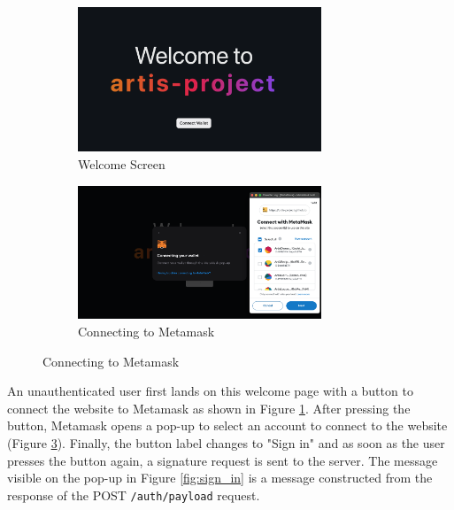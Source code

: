 \begin{figure}[h]
    \centering
    \begin{subfigure}{\textwidth}
        \centering
        \includegraphics[width=0.8\textwidth]{resources/frontend_screenshots/welcome_screen.png}
        \caption{Welcome Screen}
        \label{fig:welcome_screen}
        \vspace*{2mm}
    \end{subfigure}
    \begin{subfigure}{\textwidth}
        \centering
        \includegraphics[width=0.8\textwidth]{resources/frontend_screenshots/connecting_wallet.png}
        \caption{Connecting to Metamask}
        \label{fig:connecting_metamask}
    \end{subfigure}
\end{figure}

An unauthenticated user first lands on this welcome page with a button to connect the website to Metamask as shown in Figure \ref{fig:welcome_screen}. After pressing the button, Metamask opens a pop-up to select an account to connect to the website (Figure \ref{fig:connecting_metamask}). Finally, the button label changes to "Sign in" and as soon as the user presses the button again, a signature request is sent to the server. The message visible on the pop-up in Figure \ref{fig:sign_in} is a message constructed from the response of the POST \texttt{/auth/payload} request.


